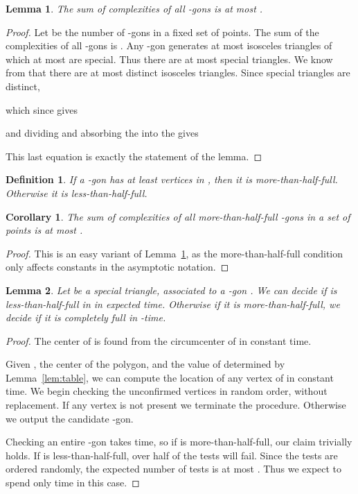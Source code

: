 \documentclass{article}
\newtheorem{lemma}{Lemma}
\newtheorem{defini}{Definition}
\newtheorem{cor}{Corollary}
\begin{document}
\begin{lemma}
\label{l2}
The sum of complexities of all -gons is at most
.
\end{lemma}

\begin{proof}
Let  be the number of -gons in a fixed set  of  points.
The sum of the complexities of all -gons is
. Any -gon generates at most 
isosceles triangles of which at most   are special.
Thus there are at most  
special triangles. We know from 
\cite{pach} that there are at most  distinct isosceles triangles.
Since special triangles are distinct, 



\noindent
which since  gives



\noindent and dividing and absorbing the  into the  gives



\noindent This last equation is exactly the statement of the lemma.
\end{proof}

\begin{defini}
If a -gon has at least  vertices in , then it is \emph{more-than-half-full}.
Otherwise it is \emph{less-than-half-full}.
\end{defini}


\begin{cor}
\label{c2}
The sum of complexities of all more-than-half-full -gons
in a set  of  points is at most .
\end{cor}

\begin{proof}
This is an easy variant of Lemma~\ref{l2}, as the more-than-half-full
condition only affects constants in the asymptotic notation.
\end{proof}

\begin{lemma}
\label{l3}
Let  be a special triangle, associated to a -gon .  We can decide if   is less-than-half-full in  in  expected time.  Otherwise if it is more-than-half-full, we decide if it is completely full in -time.  
\end{lemma}
\begin{proof}
The center of  is found from the circumcenter of  in constant time.



Given , the center of the polygon, and the value of  determined by Lemma~\ref{lem:table},
we can compute 
the location of any vertex of  in constant time.  We begin checking the  unconfirmed vertices in random order, without replacement.  If any vertex
is not present we terminate the procedure. Otherwise we output the candidate -gon.

Checking an entire -gon takes  time, so if  is more-than-half-full, our claim trivially
holds.  If  is less-than-half-full,
over half of the  tests will fail. Since the tests are ordered
randomly, the expected number of tests is at most .  Thus we expect to
spend only  time in this case.
\end{proof}
\end{document}
